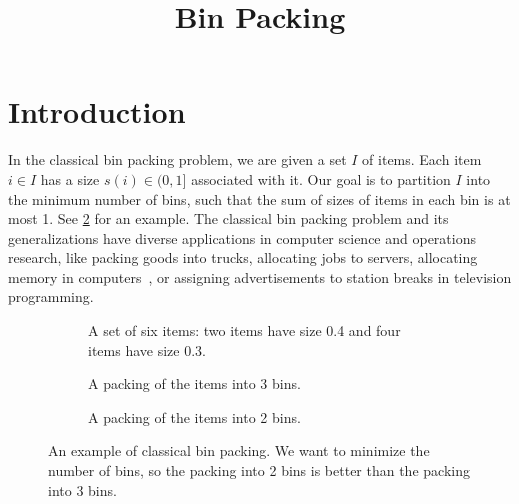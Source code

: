 \documentclass[a4paper,12pt,fleqn]{article}
\title{Bin Packing}
\author{\empty}
\date{\empty}
\begin{document}
\maketitle
\setlength{\parskip}{0.5em}

\section{Introduction}

In the classical bin packing problem, we are given a set $I$ of items.
Each item $i \in I$ has a size $s(i) \in (0, 1]$ associated with it.
Our goal is to partition $I$ into the minimum number of bins,
such that the sum of sizes of items in each bin is at most 1.
See \cref{fig:1bp} for an example.
The classical bin packing problem and its generalizations
have diverse applications in computer science and operations research,
like packing goods into trucks, allocating jobs to servers,
allocating memory in computers~\cite{handbook-of-combinopt-bp},
or assigning advertisements to station breaks in television programming.

\begin{figure}[!ht]
\centering
\begin{subfigure}{0.9\textwidth}
    \centering
    
    \caption{A set of six items: two items have size 0.4 and four items have size 0.3.}%
\label{fig:1bp:a}
\end{subfigure}
\par\bigskip\bigskip
\begin{subfigure}{0.45\textwidth}
    \centering
    
    \caption{A packing of the items into 3 bins.}
\end{subfigure}
\begin{subfigure}{0.45\textwidth}
    \centering
    
    \caption{A packing of the items into 2 bins.}
\end{subfigure}
\caption[An example of classical bin packing.]{An example of classical bin packing.
We want to minimize the number of bins, so the packing into 2 bins
is better than the packing into 3 bins.}
\label{fig:1bp}
\end{figure}



\end{document}
